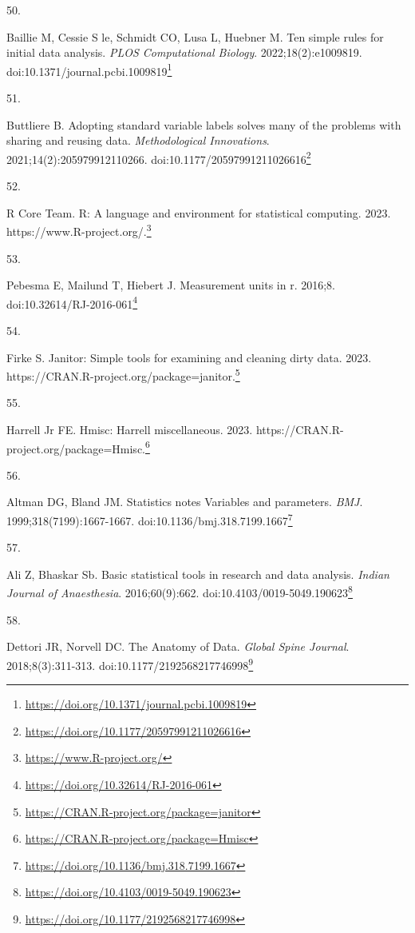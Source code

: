 \documentclass[
  a4paper,
]{book}
\newlength{\cslhangindent}
\newlength{\csllabelwidth}
\newlength{\cslentryspacingunit} %
\newenvironment{CSLReferences}[2] %
 {%
  \setlength{\parindent}{0pt}
  \ifodd #1
  \let\oldpar\par
  \def\par{\hangindent=\cslhangindent\oldpar}
  \fi
  \setlength{\parskip}{#2\cslentryspacingunit}
 }%
 {}
\newcommand{\CSLLeftMargin}[1]{\parbox[t]{\csllabelwidth}{#1}}
\newcommand{\CSLRightInline}[1]{\parbox[t]{\linewidth - \csllabelwidth}{#1}\break}
\renewcommand{\href}[2]{#2\footnote{\url{#1}}}
\begin{document}
\begin{CSLReferences}{0}{0}
\leavevmode{}%
\CSLLeftMargin{50. }%
\CSLRightInline{Baillie M, Cessie S le, Schmidt CO, Lusa L, Huebner M. Ten simple rules for initial data analysis. \emph{PLOS Computational Biology}. 2022;18(2):e1009819. doi:\href{https://doi.org/10.1371/journal.pcbi.1009819}{10.1371/journal.pcbi.1009819}}

\leavevmode{}%
\CSLLeftMargin{51. }%
\CSLRightInline{Buttliere B. Adopting standard variable labels solves many of the problems with sharing and reusing data. \emph{Methodological Innovations}. 2021;14(2):205979912110266. doi:\href{https://doi.org/10.1177/20597991211026616}{10.1177/20597991211026616}}

\leavevmode{}%
\CSLLeftMargin{52. }%
\CSLRightInline{R Core Team. R: A language and environment for statistical computing. 2023. \href{https://www.R-project.org/}{https://www.R-project.org/.}}

\leavevmode{}%
\CSLLeftMargin{53. }%
\CSLRightInline{Pebesma E, Mailund T, Hiebert J. Measurement units in {\textbraceleft}r{\textbraceright}. 2016;8. doi:\href{https://doi.org/10.32614/RJ-2016-061}{10.32614/RJ-2016-061}}

\leavevmode{}%
\CSLLeftMargin{54. }%
\CSLRightInline{Firke S. Janitor: Simple tools for examining and cleaning dirty data. 2023. \href{https://CRAN.R-project.org/package=janitor}{https://CRAN.R-project.org/package=janitor.}}

\leavevmode{}%
\CSLLeftMargin{55. }%
\CSLRightInline{Harrell Jr FE. Hmisc: Harrell miscellaneous. 2023. \href{https://CRAN.R-project.org/package=Hmisc}{https://CRAN.R-project.org/package=Hmisc.}}

\leavevmode{}%
\CSLLeftMargin{56. }%
\CSLRightInline{Altman DG, Bland JM. Statistics notes Variables and parameters. \emph{BMJ}. 1999;318(7199):1667-1667. doi:\href{https://doi.org/10.1136/bmj.318.7199.1667}{10.1136/bmj.318.7199.1667}}

\leavevmode{}%
\CSLLeftMargin{57. }%
\CSLRightInline{Ali Z, Bhaskar Sb. Basic statistical tools in research and data analysis. \emph{Indian Journal of Anaesthesia}. 2016;60(9):662. doi:\href{https://doi.org/10.4103/0019-5049.190623}{10.4103/0019-5049.190623}}

\leavevmode{}%
\CSLLeftMargin{58. }%
\CSLRightInline{Dettori JR, Norvell DC. The Anatomy of Data. \emph{Global Spine Journal}. 2018;8(3):311-313. doi:\href{https://doi.org/10.1177/2192568217746998}{10.1177/2192568217746998}}


\end{CSLReferences}
\end{document}
